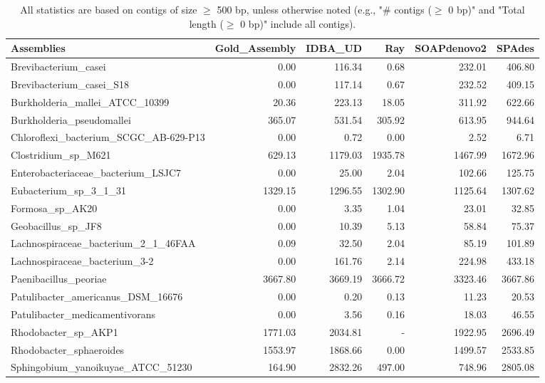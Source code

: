 \documentclass[12pt,a4paper]{article}
\begin{document}
\begin{table}[ht]
\begin{center}
\caption{All statistics are based on contigs of size $\geq$ 500 bp, unless otherwise noted (e.g., "\# contigs ($\geq$ 0 bp)" and "Total length ($\geq$ 0 bp)" include all contigs).}
\begin{tabular}{|l*{5}{|r}|}
\hline
Assemblies & Gold\_Assembly & IDBA\_UD & Ray & SOAPdenovo2 & SPAdes \\ \hline
Brevibacterium\_casei & 0.00 & 116.34 & 0.68 & 232.01 & 406.80 \\ \hline
Brevibacterium\_casei\_S18 & 0.00 & 117.14 & 0.67 & 232.52 & 409.15 \\ \hline
Burkholderia\_mallei\_ATCC\_10399 & 20.36 & 223.13 & 18.05 & 311.92 & 622.66 \\ \hline
Burkholderia\_pseudomallei & 365.07 & 531.54 & 305.92 & 613.95 & 944.64 \\ \hline
Chloroflexi\_bacterium\_SCGC\_AB-629-P13 & 0.00 & 0.72 & 0.00 & 2.52 & 6.71 \\ \hline
Clostridium\_sp\_M621 & 629.13 & 1179.03 & 1935.78 & 1467.99 & 1672.96 \\ \hline
Enterobacteriaceae\_bacterium\_LSJC7 & 0.00 & 25.00 & 2.04 & 102.66 & 125.75 \\ \hline
Eubacterium\_sp\_3\_1\_31 & 1329.15 & 1296.55 & 1302.90 & 1125.64 & 1307.62 \\ \hline
Formosa\_sp\_AK20 & 0.00 & 3.35 & 1.04 & 23.01 & 32.85 \\ \hline
Geobacillus\_sp\_JF8 & 0.00 & 10.39 & 5.13 & 58.84 & 75.37 \\ \hline
Lachnospiraceae\_bacterium\_2\_1\_46FAA & 0.09 & 32.50 & 2.04 & 85.19 & 101.89 \\ \hline
Lachnospiraceae\_bacterium\_3-2 & 0.00 & 161.76 & 2.14 & 224.98 & 433.18 \\ \hline
Paenibacillus\_peoriae & 3667.80 & 3669.19 & 3666.72 & 3323.46 & 3667.86 \\ \hline
Patulibacter\_americanus\_DSM\_16676 & 0.00 & 0.20 & 0.13 & 11.23 & 20.53 \\ \hline
Patulibacter\_medicamentivorans & 0.00 & 3.56 & 0.16 & 18.03 & 46.55 \\ \hline
Rhodobacter\_sp\_AKP1 & 1771.03 & 2034.81 & - & 1922.95 & 2696.49 \\ \hline
Rhodobacter\_sphaeroides & 1553.97 & 1868.66 & 0.00 & 1499.57 & 2533.85 \\ \hline
Sphingobium\_yanoikuyae\_ATCC\_51230 & 164.90 & 2832.26 & 497.00 & 748.96 & 2805.08 \\ \hline

\end{tabular}
\end{center}
\end{table}
\end{document}
